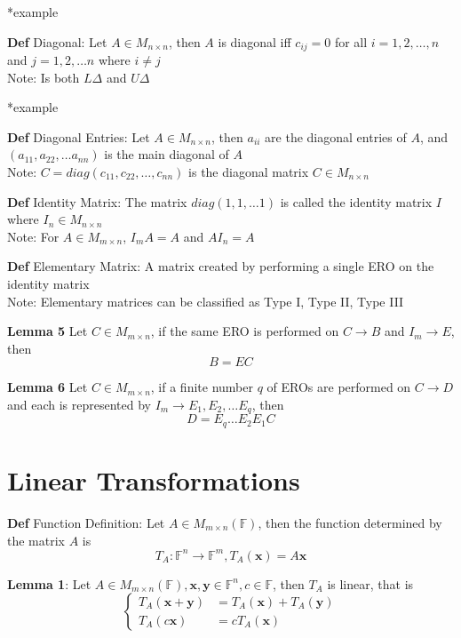 \documentclass[11pt,notitlepage]{report}
\newcommand{\bb}[1]{\ensuremath{\mathbb{#1}}}
\newcommand{\tbf}[1]{\textbf{#1}}
\begin{document}
*example

\textbf{Def} Diagonal: Let $A \in M_{n \times n}$, then $A$ is diagonal iff $c_{ij} = 0$ for all $i = 1, 2, \dots, n$ and $j = 1, 2, \dots n$ where $i \ne j$\\
\hspace*{5mm} Note: Is both $L\Delta$ and $U\Delta$

*example

\textbf{Def} Diagonal Entries: Let $A \in M_{n \times n}$, then $a_{ii}$ are the diagonal entries of $A$, and $(a_{11}, a_{22}, \dots a_{nn})$ is the main diagonal of $A$\\
\hspace*{5mm} Note: $C = diag(c_{11}, c_{22}, \dots, c_{nn})$ is the diagonal matrix $C \in M_{n \times n}$

\textbf{Def} Identity Matrix: The matrix $diag(1, 1, \dots 1)$ is called the identity matrix $I$ where $I_n \in M_{n \times n}$\\
\hspace*{5mm} Note: For $A \in M_{m \times n}$, $I_mA = A$ and $AI_n = A$

\textbf{Def} Elementary Matrix: A matrix created by performing a single ERO on the identity matrix\\
\hspace*{5mm} Note: Elementary matrices can be classified as Type I, Type II, Type III

\textbf{Lemma 5} Let $C \in M_{m \times n}$, if the same ERO is performed on $C \rightarrow B$ and $I_m \rightarrow E$, then
$$B = EC$$

\textbf{Lemma 6} Let $C \in M_{m \times n}$, if a finite number $q$ of EROs are performed on $C \rightarrow D$ and each is represented by $I_m \rightarrow E_1, E_2, \dots E_q$, then
$$D = E_q\dots E_2E_1C$$


\newpage

\section{Linear Transformations}

\textbf{Def} Function Definition: Let $A \in M_{m \times n}(\bb F)$, then the function determined by the matrix $A$ is 
$$T_A : \bb F^n \rightarrow \bb F^m, T_A(\tbf x) = A\tbf x$$

\textbf{Lemma 1}: Let $A \in M_{m \times n}(\bb F), \tbf x, \tbf y \in \bb F^n, c \in \bb F$, then $T_A$ is linear, that is\\
$$\begin{cases}T_A(\tbf x + \tbf y) &= T_A(\tbf x) + T_A(\tbf y)\\ T_A(c\tbf x) &= cT_A(\tbf x)
\end{cases}$$
\end{document}
